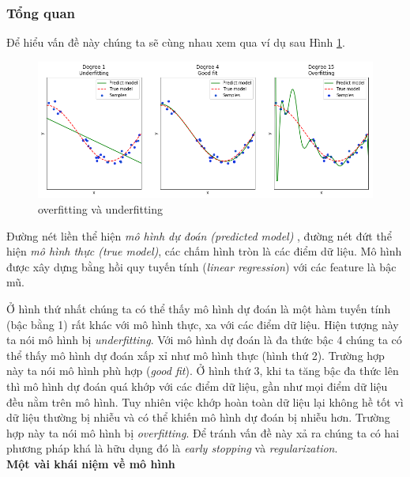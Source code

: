 \subsubsection{Tổng quan}
\hspace{5mm} Để hiểu vấn đề này chúng ta sẽ cùng nhau xem qua ví dụ sau  Hình \ref{fig:overfitting}.
\begin{center}
 	\begin{figure}[H]
    \begin{center}
    \includegraphics[scale=0.5]{chap3/image/overfitting.png}
    \end{center}
    \caption{overfitting và underfitting}
    \label{fig:overfitting}
    \end{figure}
\end{center}
Đường nét liền thể hiện \textit{mô hình dự đoán (predicted model)} , đường nét đứt thể hiện \textit{mô hình thực (true model)}, các chấm hình tròn là các điểm dữ liệu. Mô hình được xây dựng bằng hồi quy tuyến tính (\textit{linear regression}) với các feature là bậc mũ.\par
Ở hình thứ nhất chúng ta có thể thấy mô hình dự đoán là một hàm tuyến tính (bậc bằng 1) rất khác với mô hình thực, xa với các điểm dữ liệu. Hiện tượng này ta nói mô hình bị \textit{underfitting}.
Với mô hình dự đoán là đa thức bậc 4 chúng ta có thể thấy mô hình dự đoán xấp xỉ như mô hình thực (hình thứ 2). Trường hợp này ta nói mô hình phù hợp (\textit{good fit}). Ở hình thứ 3, khi ta tăng bậc đa thức lên thì mô hình dự đoán quá khớp với các điểm dữ liệu, gần như mọi điểm dữ liệu đều nằm trên mô hình. Tuy nhiên việc khớp hoàn toàn dữ liệu lại không hề tốt vì dữ liệu thường bị nhiễu và có thể khiến mô hình dự đoán bị nhiễu hơn. Trường hợp này ta nói mô hình bị\textit{ overfitting}. Để tránh vấn đề này xả ra chúng ta có hai phương pháp khá là hữu dụng đó là \textit{early stopping} và \textit{regularization}.\\
\textbf{Một vài khái niệm về mô hình}
